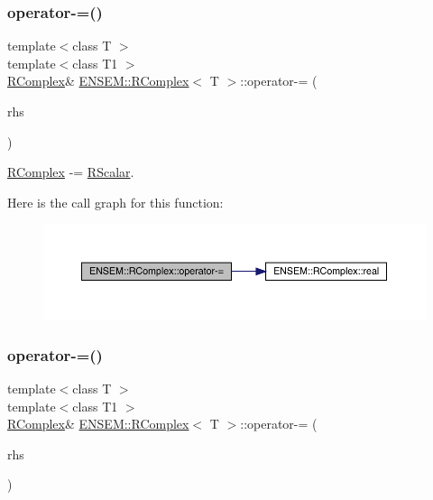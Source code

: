 \subsubsection{\texorpdfstring{operator-\/=()}{operator-=()}\hspace{0.1cm}{\footnotesize\ttfamily [2/6]}}
{\footnotesize\ttfamily template$<$class T $>$ \\
template$<$class T1 $>$ \\
\mbox{\hyperlink{classENSEM_1_1RComplex}{R\+Complex}}\& \mbox{\hyperlink{classENSEM_1_1RComplex}{E\+N\+S\+E\+M\+::\+R\+Complex}}$<$ T $>$\+::operator-\/= (\begin{DoxyParamCaption}\item[{const \mbox{\hyperlink{classENSEM_1_1RScalar}{R\+Scalar}}$<$ T1 $>$ \&}]{rhs }\end{DoxyParamCaption})\hspace{0.3cm}{\ttfamily [inline]}}



\mbox{\hyperlink{classENSEM_1_1RComplex}{R\+Complex}} -\/= \mbox{\hyperlink{classENSEM_1_1RScalar}{R\+Scalar}}. 

Here is the call graph for this function\+:
\nopagebreak
\begin{figure}[H]
\begin{center}
\leavevmode
\includegraphics[width=350pt]{d9/d0e/classENSEM_1_1RComplex_af071c8c8f4d2a2cf17a9e4b01accf6bc_cgraph}
\end{center}
\end{figure}
\mbox{\label{classENSEM_1_1RComplex_af071c8c8f4d2a2cf17a9e4b01accf6bc}} 
\subsubsection{\texorpdfstring{operator-\/=()}{operator-=()}\hspace{0.1cm}{\footnotesize\ttfamily [3/6]}}
{\footnotesize\ttfamily template$<$class T $>$ \\
template$<$class T1 $>$ \\
\mbox{\hyperlink{classENSEM_1_1RComplex}{R\+Complex}}\& \mbox{\hyperlink{classENSEM_1_1RComplex}{E\+N\+S\+E\+M\+::\+R\+Complex}}$<$ T $>$\+::operator-\/= (\begin{DoxyParamCaption}\item[{const \mbox{\hyperlink{classENSEM_1_1RScalar}{R\+Scalar}}$<$ T1 $>$ \&}]{rhs }\end{DoxyParamCaption})\hspace{0.3cm}{\ttfamily [inline]}}



